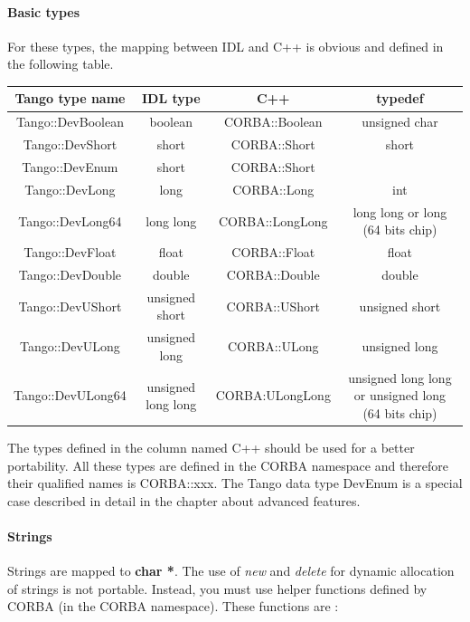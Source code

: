\paragraph{Basic types}

For these types, the mapping between IDL and C++ is obvious and defined
in the following table.

\vspace{0.3cm}

\begin{center}
\begin{longtable}{|c|c|c|c|}
\hline 
Tango type name & IDL type & C++ & typedef\tabularnewline
\hline 
\hline 
Tango::DevBoolean & boolean & CORBA::Boolean & unsigned char\tabularnewline
\hline 
Tango::DevShort & short & CORBA::Short & short\tabularnewline
\hline 
Tango::DevEnum & short & CORBA::Short & \tabularnewline
\hline 
Tango::DevLong & long & CORBA::Long & int\tabularnewline
\hline 
Tango::DevLong64 & long long & CORBA::LongLong & long long or long (64 bits chip)\tabularnewline
\hline 
Tango::DevFloat & float & CORBA::Float & float\tabularnewline
\hline 
Tango::DevDouble & double & CORBA::Double & double\tabularnewline
\hline 
Tango::DevUShort & unsigned short & CORBA::UShort & unsigned short\tabularnewline
\hline 
Tango::DevULong & unsigned long & CORBA::ULong & unsigned long\tabularnewline
\hline 
Tango::DevULong64 & unsigned long long & CORBA:ULongLong & unsigned long long or unsigned long (64 bits chip)\tabularnewline
\hline 
\end{longtable}
\par\end{center}

\vspace{0.3cm}

The types defined in the column named C++ should be used for a better
portability. All these types are defined in the CORBA namespace and
therefore their qualified names is CORBA::xxx. The Tango data type
DevEnum is a special case described in detail in the
chapter about advanced features.

\paragraph{Strings}

Strings are mapped to \textbf{char {*}}. The use of \emph{new} and
\emph{delete} for dynamic allocation of strings is not portable. Instead,
you must use helper functions defined by CORBA (in the CORBA namespace).
These functions are :

